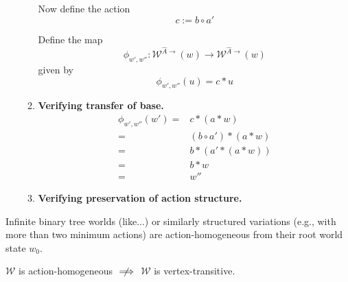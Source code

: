 \begin{proofE}
\begin{enumerate}
\begin{enumerate}
        Now define the action
        \begin{equation}
            c := b \circ a'
        \end{equation}

        Define the map
        \begin{equation}
            \phi_{w', w''}: \mathscr{W}^{\hat{A}\to}(w) \to \mathscr{W}^{\hat{A}\to}(w)
        \end{equation}
        given by
        \begin{equation}
            \phi_{w', w''}(u) = c \ast u
        \end{equation}

    \item \textbf{Verifying transfer of base.}
    \begin{align}
        \phi_{w', w''}(w') = & c \ast (a \ast w) \\
        = & (b \circ a') \ast (a \ast w) \\
        = & b \ast (a' \ast (a \ast w)) \\
        = & b \ast w \\
        = & w''
    \end{align}

    \item \textbf{Verifying preservation of action structure.}
    

    
    \end{enumerate}

    
\end{enumerate}
\end{proofE}








\noindent\makebox[\linewidth]{\rule{\paperwidth}{2pt}}

\begin{corollary}
    Infinite binary tree worlds (like...) or similarly structured variations (e.g., with more than two minimum actions) are action-homogeneous from their root world state $w_{0}$.
\end{corollary}

\begin{corollary}
    $\mathscr{W}$ is action-homogeneous $\centernot\implies$ $\mathscr{W}$ is vertex-transitive.
\end{corollary}





